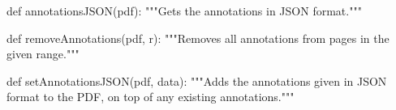 def annotationsJSON(pdf):
    """Gets the annotations in JSON format."""

def removeAnnotations(pdf, r):
    """Removes all annotations from pages in the given range."""

def setAnnotationsJSON(pdf, data):
    """Adds the annotations given in JSON format to the PDF, on top of any
    existing annotations."""
